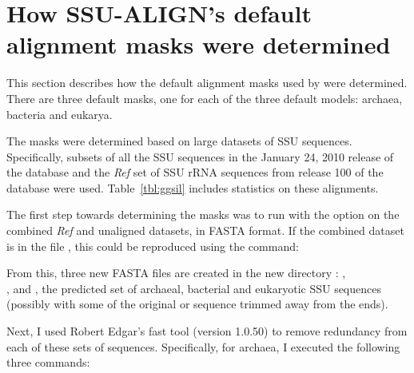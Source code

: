 \section{How SSU-ALIGN's default alignment masks were determined}
\label{sec:masks}

This section describes how the default alignment masks used by
 were determined. There are three default masks,
one for each of the three default models: archaea, bacteria and
eukarya.

The masks were determined based on large datasets
of SSU sequences. Specifically, subsets of all the SSU sequences in
the  January 24, 2010 release of the  database 
\cite{DeSantis06} and the \emph{Ref} set of SSU rRNA sequences from
release 100 of the  database
\cite{Pruesse07} were used. Table~\ref{tbl:ggsil} includes statistics
on these alignments. 

The first step towards determining the masks was to run
 with the  option on the combined
 \emph{Ref} and  unaligned
datasets, in FASTA format. If the combined dataset is in the file
, this could be reproduced using the command:


From this, three new FASTA files are created in the new directory
: , \\ ,
and , 
the predicted set of archaeal, bacterial and eukaryotic
SSU sequences (possibly with some of the original
 or  sequence trimmed away from
the ends). 

Next, I used Robert Edgar's fast  tool (version 1.0.50) to
remove redundancy from each of these sets of sequences. Specifically, for
archaea, I executed the following three  commands:




